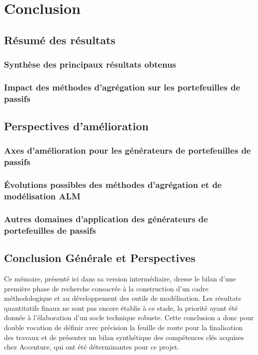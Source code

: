 \chapter{Conclusion}
\section{Résumé des résultats}
\subsection{Synthèse des principaux résultats obtenus}
\subsection{Impact des méthodes d'agrégation sur les portefeuilles de passifs}

\section{Perspectives d'amélioration}
\subsection{Axes d'amélioration pour les générateurs de portefeuilles de passifs}
\subsection{Évolutions possibles des méthodes d'agrégation et de modélisation ALM}  
\subsection{Autres domaines d'application des générateurs de portefeuilles de passifs}
\section{Conclusion Générale et Perspectives}

Ce mémoire, présenté ici dans sa version intermédiaire, dresse le bilan d'une première phase de recherche consacrée à la construction d'un cadre méthodologique et au développement des outils de modélisation. Les résultats quantitatifs finaux ne sont pas encore établis à ce stade, la priorité ayant été donnée à l'élaboration d'un socle technique robuste. Cette conclusion a donc pour double vocation de définir avec précision la feuille de route pour la finalisation des travaux et de présenter un bilan synthétique des compétences clés acquises chez Accenture, qui ont été déterminantes pour ce projet.

